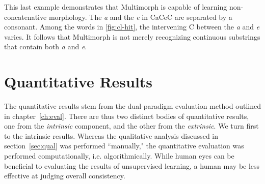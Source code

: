 This last example demonstrates that Multimorph is capable of learning non-concatenative morphology. 
The \textit{a} and the \textit{e} in CaCeC are separated by a consonant. Among the words in \ref{fig:cl-hit}, 
the intervening C between the \textit{a} and \textit{e} varies. It follows that Multimorph is not merely recognizing 
continuous substrings that contain both \textit{a} and \textit{e}.



\section{Quantitative Results}
The quantitative results stem from the dual-paradigm evaluation method outlined in chapter~\ref{ch:eval}. 
There are thus two distinct bodies of quantitative results, one from the \emph{intrinsic} component, and 
the other from the \emph{extrinsic}. We turn first to the intrinsic results.
	Whereas the qualitative analysis discussed in section~\ref{sec:qual} was performed 
	``manually," the quantitative evaluation was performed computationally, i.e. algorithmically. 
	While human eyes can be beneficial to evaluating the results of unsupervised learning, 
	a human may be less effective at judging overall consistency. 
